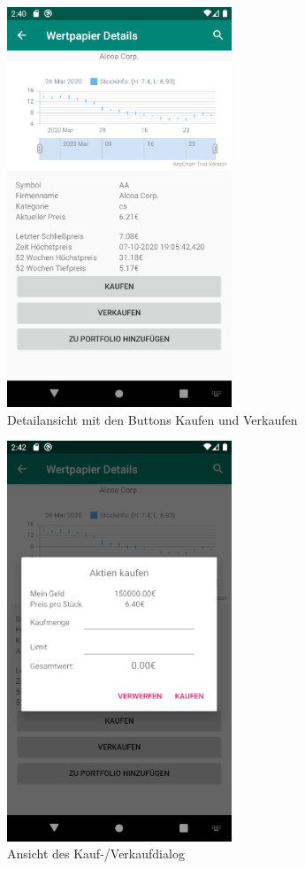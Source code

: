 \documentclass[10pt]{scrartcl}
\begin{document}
\begin{figure}[H]
	\centering
	\includegraphics[width=0.6\textwidth]{Bilder/Prsi/detailansicht.png}
	\caption{Detailansicht mit den Buttons Kaufen und Verkaufen}
\end{figure}

\begin{figure}[H]
	\centering
	\includegraphics[width=0.6\textwidth]{Bilder/Prsi/Kaufdialog.png}
	\caption{Ansicht des Kauf-/Verkaufdialog}
\end{figure}
\end{document}
